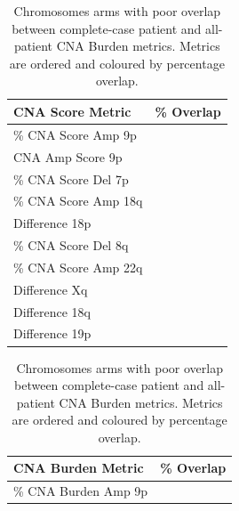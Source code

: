 \begin{table}[!ht]
    \begin{minipage}{.49\linewidth}
      \caption[Chromosomes arms with poor overlap between complete-case patient and all-patient CNA Score metrics.]{Chromosomes arms with poor overlap between complete-case patient and all-patient CNA Score metrics. Metrics are ordered and coloured by percentage overlap.}
      \centering 
\begin{tabular}[t]{l>{}r}
\toprule
CNA Score Metric & \% Overlap\\
\midrule
\% CNA Score Amp 9p & \cellcolor[HTML]{414487}{\textcolor{white}{11.00}}\\
 
CNA Amp Score 9p & \cellcolor[HTML]{443C84}{\textcolor{white}{16.69}}\\
 
\% CNA Score Del 7p & \cellcolor[HTML]{481F70}{\textcolor{white}{42.65}}\\
 
\% CNA Score Amp 18q & \cellcolor[HTML]{481466}{\textcolor{white}{55.59}}\\
 
Difference 18p & \cellcolor[HTML]{450458}{\textcolor{white}{74.15}}\\
 
\% CNA Score Del 8q & \cellcolor[HTML]{450457}{\textcolor{white}{75.14}}\\
 
\% CNA Score Amp 22q & \cellcolor[HTML]{440256}{\textcolor{white}{76.71}}\\
 
Difference Xq & \cellcolor[HTML]{440155}{\textcolor{white}{77.85}}\\
 
Difference 18q & \cellcolor[HTML]{440155}{\textcolor{white}{78.80}}\\
 
Difference 19p & \cellcolor[HTML]{440154}{\textcolor{white}{79.10}}\\
\bottomrule
\end{tabular} \label{table:CNAScoreT2}
    \end{minipage}%
    \hspace{0.3cm}
    \begin{minipage}{.49\linewidth}
      \centering
      \caption[Chromosomes arms with poor overlap between complete-case patient and all-patient CNA Burden metrics.]{Chromosomes arms with poor overlap between complete-case patient and all-patient CNA Burden metrics. Metrics are ordered and coloured by percentage overlap.}
\begin{tabular}[t]{l>{}r}
\toprule
CNA Burden Metric & \% Overlap\\
\midrule
\% CNA Burden Amp 9p & \cellcolor[HTML]{414487}{\textcolor{white}{10.84}}\\
 

\end{tabular}
\end{minipage}
\end{table}
